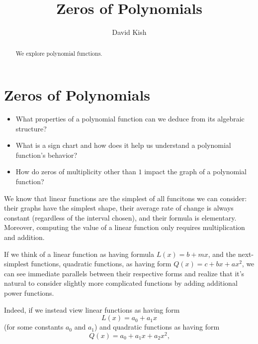\documentclass{ximera}
\author{David Kish}
\title{Zeros of Polynomials}
\begin{document}
\begin{abstract}
We explore polynomial functions.
\end{abstract}
\maketitle

%
%
%
\section{Zeros of Polynomials}
\begin{motivatingQuestions}\begin{itemize}
\item What properties of a polynomial function can we deduce from its algebraic structure?%
\item What is a sign chart and how does it help us understand a polynomial function's behavior?%
\item How do zeros of multiplicity other than $1$ impact the graph of a polynomial function?%
\end{itemize}\end{motivatingQuestions}

We know that linear functions are the simplest of all funcitons we can consider:  their graphs have the simplest shape, their average rate of change is always constant (regardless of the interval chosen), and their formula is elementary.  Moreover, computing the value of a linear function only requires multiplication and addition.%

If we think of a linear function as having formula $L(x) = b + mx$, and the next-simplest functions, quadratic functions, as having form $Q(x) = c + bx + ax^2$, we can see immediate parallels between their respective forms and realize that it's natural to consider slightly more complicated functions by adding additional power functions.%

Indeed, if we instead view linear functions as having form%
$$
L(x) = a_0 + a_1 x
$$
(for some constants $a_0$ and $a_1$) and quadratic functions as having form%
$$
Q(x) = a_0 + a_1 x + a_2 x^2\text{,}
$$
\end{document}
